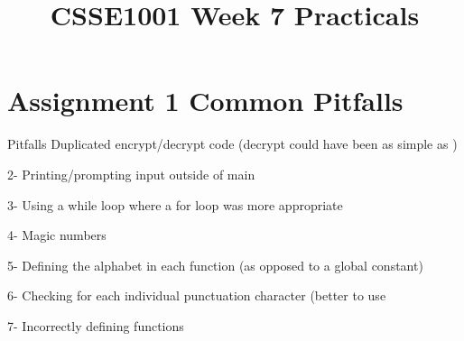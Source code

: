 \documentclass[week2]{csse1001}
\title{CSSE1001 Week 7 Practicals}
\begin{document}
\begin{frame} 
\maketitle
\end{frame}

\section{Assignment 1 Common Pitfalls}

\begin{topic}{Pitfalls}
Duplicated encrypt/decrypt code (decrypt could have been as simple as )

\begin{subtopic}{2-}
Printing/prompting input outside of main
\end{subtopic}

\begin{subtopic}{3-}
Using a while loop where a for loop was more appropriate
\end{subtopic}

\begin{subtopic}{4-}
Magic numbers
\end{subtopic}

\begin{subtopic}{5-}
Defining the alphabet in each function (as opposed to a global constant)
\end{subtopic}

\begin{subtopic}{6-}
Checking for each individual punctuation character (better to use 
\end{subtopic}

\begin{subtopic}{7-}
Incorrectly defining functions
\end{subtopic}

\end{topic}
\end{document}
